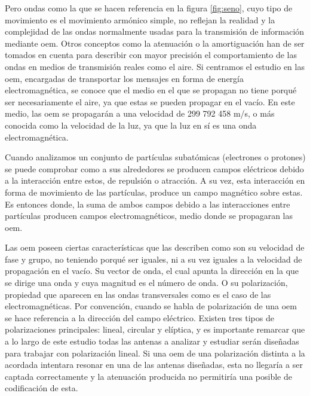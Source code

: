 \par Pero ondas como la que se hacen referencia en la figura \ref{fig:seno}, cuyo tipo de movimiento es el movimiento armónico simple, no reflejan la realidad y la complejidad de las ondas normalmente usadas para la transmisión de información mediante \gls{oem}. Otros conceptos como la atenuación o la amortiguación han de ser tomados en cuenta para describir con mayor precisión el comportamiento de las ondas en medios de transmisión reales como el aire. Si centramos el estudio en las \gls{oem}, encargadas de transportar los mensajes en forma de energía electromagnética, se conoce que el medio en el que se propagan no tiene porqué ser necesariamente el aire, ya que estas se pueden propagar en el vacío. En este medio, las \gls{oem} se propagarán a una velocidad de 299 792 458 m/s, o más conocida como la velocidad de la luz, ya que la luz en sí es una onda electromagnética. 
\\
\par Cuando analizamos un conjunto de partículas subatómicas (electrones o protones) se puede comprobar como a sus alrededores se producen campos eléctricos debido a la interacción entre estos, de repulsión o atracción. A su vez, esta interacción en forma de movimiento de las partículas, produce un campo magnético sobre estas. Es entonces donde, la suma de ambos campos debido a las interacciones entre partículas producen campos electromagnéticos, medio donde se propagaran las \gls{oem}. \cite{Peribanez2014}
\\
\par Las \gls{oem} poseen ciertas características que las describen como son su velocidad de fase y grupo, no teniendo porqué  ser iguales, ni a su vez iguales a la velocidad de propagación en el vacío. Su vector de onda, el cual apunta la dirección en la que se dirige una onda y cuya magnitud es el número de onda. O su polarización, propiedad que aparecen en las ondas transversales como es el caso de las electromagnéticas. Por convención, cuando se habla de polarización de una \gls{oem} se hace referencia a la dirección del campo eléctrico. Existen tres tipos de polarizaciones principales: lineal, circular y elíptica, y es importante remarcar que a lo largo de este estudio todas las antenas a analizar y estudiar serán diseñadas para trabajar con polarización lineal. Si una \gls{oem} de una polarización distinta a la acordada intentara resonar en una de las antenas diseñadas, esta no llegaría a ser captada correctamente y la atenuación producida no permitiría una posible de codificación de esta. \cite{UCO}
